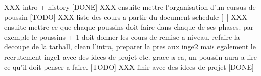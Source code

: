 %
%

XXX intro + history [DONE]
XXX ensuite mettre l'organisation d'un cursus de poussin [TODO]
XXX liste des cours a partir du document schedule [~]
XXX ensuite mettre ce que chaque poussins doit faire dans chaque de
    ses phases. par exemple le poussins + 1 doit donner les cours de remise
    a niveau, refaire la decoupe de la tarball, clean l'intra, preparer la
    pres aux inge2 mais egalement le recrutement inge1 avec des idees de
    projet etc. grace a ca, un poussin aura a lire ce qu'il doit penser
    a faire. [TODO]
XXX finir avec des idees de projet [DONE]
